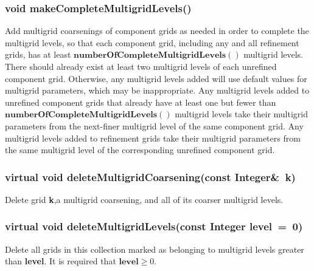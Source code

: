 \documentclass{article}
\begin{document}
  \subsubsection{void makeCompleteMultigridLevels()}
  \label{CompositeGrid::makeCompleteMultigridLevels()}
    Add multigrid coarsenings of component grids as needed in order to complete the multigrid levels, so that each component grid, including
    any and all refinement grids, has at least $\textbf{numberOfCompleteMultigridLevels}()$ multigrid levels.
    There should already exist at least two multigrid levels of each unrefined component grid.  Otherwise, any multigrid levels added will use
    default values for multigrid parameters, which may be inappropriate.  Any multigrid levels added to unrefined component grids that already
    have at least one but fewer than $\textbf{numberOfCompleteMultigridLevels}()$ multigrid levels take their multigrid parameters from the
    next-finer multigrid level of the same component grid.  Any multigrid levels added to refinement grids take their multigrid parameters from
    the same multigrid level of the corresponding unrefined component grid.

  \subsubsection{virtual void deleteMultigridCoarsening(const Integer\&~k)}
  \label{CompositeGrid::deleteMultigridCoarsening(k)}
    Delete grid \textbf{k},a multigrid coarsening, and all of its coarser multigrid levels.

  \subsubsection{virtual void deleteMultigridLevels(const Integer level~=~0)}
  \label{CompositeGrid::deleteMultigridLevels(level)}
    Delete all grids in this collection marked as belonging to multigrid levels greater than \textbf{level}.
    It is required that $\textbf{level}\ge0$.
\end{document}
